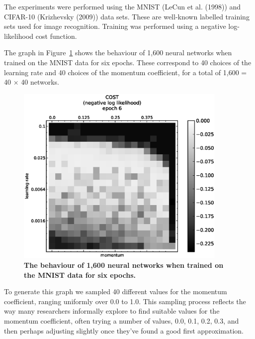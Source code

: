 \documentclass[10pt]{article}
\begin{document}
The experiments were performed using the MNIST (LeCun et al. (1998))
and CIFAR-10 (Krizhevsky (2009)) data sets.  These are well-known
labelled training sets used for image recognition.  Training was
performed using a negative log-likelihood cost function.

The graph in Figure~\ref{fig:mnist_basic} shows the behaviour of 1,600
neural networks when trained on the MNIST data for six epochs. These
correspond to 40 choices of the learning rate and 40 choices of the
momentum coefficient, for a total of 1,600 = 40 $\times$ 40 networks.

%
\begin{figure}[!ht]
\begin{center}
\includegraphics[width=4in]{plots/detailed/LF-20R10R-20T10-MNIST-6.eps}
\end{center}
\caption{ {\bf The behaviour of 1,600 neural networks when trained on
    the MNIST data for six epochs.}}
\label{fig:mnist_basic}
\end{figure}
%
%
%
%
%

To generate this graph we sampled 40 different values for the momentum
coefficient, ranging uniformly over 0.0 to 1.0.  This sampling process
reflects the way many researchers informally explore to find suitable
values for the momentum coefficient, often trying a number of values,
0.0, 0.1, 0.2, 0.3, and then perhaps adjusting slightly once they've
found a good first approximation.
\end{document}

